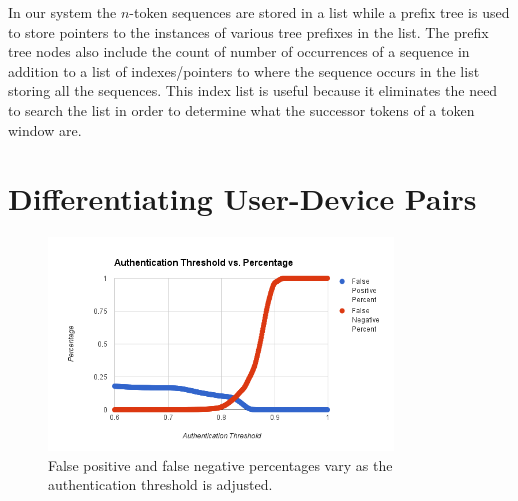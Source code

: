 \documentclass{acm_proc_article-sp}
\begin{document}


In our system the $n$-token sequences are stored in a list while a prefix tree is used to store pointers to the instances of various tree prefixes in the list. 
The prefix tree nodes also include the count of number of occurrences of a sequence in addition
to a list of indexes/pointers to where the sequence occurs in the list storing all the sequences.
This index list is useful because it eliminates the need to search the list in order to determine what the successor tokens of a token window are.




\section{Differentiating User-Device Pairs}
\label{sec:differentiation}


\begin{figure}
\centering
\includegraphics[width=3.6in]{threshold_vs_percentages.png}
\caption{False positive and false negative percentages vary as the authentication threshold is adjusted.}
\label{fig:threshold_vs_percentages}
\end{figure}
\end{document}
